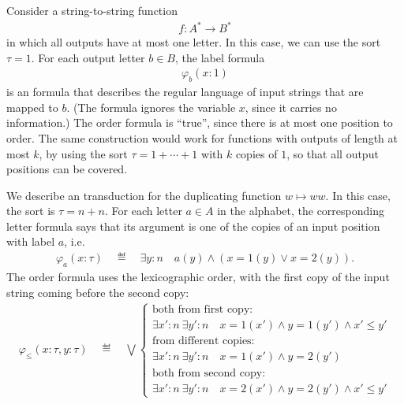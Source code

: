 \begin{myexample} Consider a string-to-string function 
    \begin{align*}
    f : A^* \to B^*
    \end{align*} 
    in which all outputs have at most one letter. In this case, we can use the sort  $\tau = 1$. For each output letter $b \in B$, the label formula 
    \begin{align*}
    \varphi_b(x : 1)
    \end{align*}
    is an \mso formula that describes the regular language of input strings that are mapped to $b$. (The formula ignores the variable $x$, since it carries no information.) The order formula is ``true'', since there is at most one position to order. The same construction would work for functions with outputs of length at most $k$, by using the sort $\tau = 1 + \cdots + 1$ with $k$ copies of $1$, so that all output positions can be covered.
\end{myexample}

\begin{myexample} 
    We describe an \mso transduction for the duplicating function $w \mapsto ww$. In this case, the  sort is $\tau = n + n$. For each letter $a \in A$ in the alphabet, the corresponding letter formula says that its argument  is one of the copies of an input position with label $a$, i.e.
    \begin{align*}
   \varphi_a( x : \tau) \quad \eqdef \quad  \exists y : n \quad a(y) \land (x = 1(y)  \lor x = 2(y)).
    \end{align*}
    The order formula uses the lexicographic order, with the first copy of the input string coming before the second copy:
\begin{align*}
\varphi_\leq ( x : \tau, y : \tau) 
\quad \eqdef \quad  
\bigvee
\begin{cases}
    \text{both from first copy:} \\
    \exists x' : n \ \exists y' : n \quad x = 1(x') \land y = 1(y') \land x' \leq y' \\
    \text{from different copies:} \\
    \exists x' : n \ \exists y' : n \quad x = 1(x') \land y = 2(y') \\
    \text{both from second copy:} \\
    \exists x' : n \ \exists y' : n \quad x = 2(x') \land y = 2(y') \land x' \leq y' 
\end{cases}
\end{align*}    
\end{myexample}

